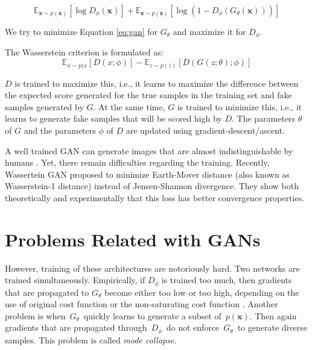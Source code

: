 \documentclass[a4paper,onesided,12pt]{report}
\begin{document}
\begin{equation}
\label{eq:gan}
\mathbb{E}_{\boldsymbol{x} \sim p(\boldsymbol{x})} [ \log{D_{\phi}(\boldsymbol{x})} ] + 
\mathbb{E}_{\boldsymbol{z} \sim p(\boldsymbol{z})} [ \log{(1-D_{\phi}(G_{\theta}(\boldsymbol{x})))} ]
\end{equation} 

We try to minimize Equation \ref{eq:gan} for $G_{\theta}$ and maximize it for $D_{\phi}$.

The Wasserstein criterion \cite{wgan} is formulated as:
\begin{equation}
\mathbb{E}_{x\sim p(x} [D(x;\phi)] - 
    \mathbb{E}_{z\sim p(z)} [D(G(z;\theta);\phi)]
\label{eq:wgan}
\end{equation}

$D$ is trained to maximize this, i.e., it learns to maximize the difference between the expected score generated for the true samples in the training set and fake samples generated by $G$. At the same time, $G$ is trained to minimize this, i.e., it learns to generate fake samples that will be scored high by $D$. The parameters $\theta$ of $G$ and the parameters $\phi$ of $D$ are updated using gradient-descent/ascent. 

A well trained GAN can generate images that are almost indistinguishable by humans \cite{biggan,proggan,stylegan}. Yet, there remain difficulties regarding the training. Recently, Wassertein GAN \cite{wgan} proposed to minimize Earth-Mover distance (also known as Wasserstein-1 distance) instead of Jensen-Shannon divergence. They show both theoretically and experimentally that this loss has better convergence properties.

\section{Problems Related with GANs}
\label{sec:problems}

However, training of these architectures are notoriously hard. Two networks are trained simultaneously. Empirically, if $D_{\phi}$ is trained too much, then gradients that are propagated to $G_{\theta}$ become either too low or too high, depending on the use of original cost function or the non-saturating cost function \cite{principledmethods}. Another problem is when~$G_{\theta}$~quickly learns to generate a subset of~$p(\boldsymbol{x})$. Then again gradients that are propagated through~$D_{\phi}$~do not enforce~$G_{\theta}$~to generate diverse samples. This problem is called \emph{mode collapse}.
\end{document}
